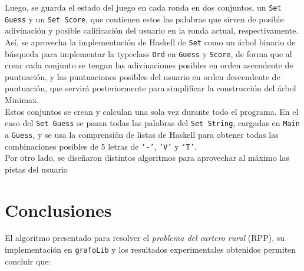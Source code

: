 \documentclass[11pt]{article}
\begin{document}
Luego, se guarda el estado del juego en cada ronda en dos conjuntos, un
\texttt{Set Guess} y un \texttt{Set Score}, que contienen estos las palabras que
sirven de posible adivinación y posible calificación del usuario en la ronda actual,
respectivamente. Así, se aprovecha la implementación de Haskell de \texttt{Set} como
un árbol binario de búsqueda para implementar la typeclass \texttt{Ord} en \texttt{Guess} y \texttt{Score}, de forma que al crear cada conjunto se tengan las
adivinaciones posibles en orden ascendente de puntuación, y las puntuaciones posibles
del usuario en orden descendente de puntuación, que servirá posteriormente para
simplificar la construcción del árbol Minimax. \\

Estos conjuntos se crean y calculan una sola vez durante todo el programa. En el caso
del \texttt{Set Guess} se pasan todas las palabras del \texttt{Set String}, cargadas en
\texttt{Main} a \texttt{Guess}, y se usa la comprensión de listas de Haskell para
obtener todas las combinaciones posibles de 5 letras de \texttt{`-'}, \texttt{`V'} y
\texttt{`T'}. \\

Por otro lado, se diseñaron distintos algoritmos para aprovechar al máximo las pistas
del usuario

\section{Conclusiones}

El algoritmo presentado para resolver el \emph{problema del cartero rural} (RPP),
su implementación en \texttt{grafoLib} y los resultados 
experimentales obtenidos permiten concluir que:
\end{document}
